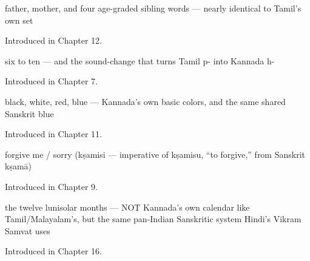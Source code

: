 \noindent\begin{minipage}[t]{\linewidth}
\raggedright
\textbf{     }\par
\small father, mother, and four age-graded sibling words — nearly identical to Tamil's own set\par
\footnotesize Introduced in Chapter 12.
\end{minipage}\par\medskip

\noindent\begin{minipage}[t]{\linewidth}
\raggedright
\textbf{    }\par
\small six to ten — and the sound-change that turns Tamil p- into Kannada h-\par
\footnotesize Introduced in Chapter 7.
\end{minipage}\par\medskip

\noindent\begin{minipage}[t]{\linewidth}
\raggedright
\textbf{   }\par
\small black, white, red, blue — Kannada's own basic colors, and the same shared Sanskrit blue\par
\footnotesize Introduced in Chapter 11.
\end{minipage}\par\medskip

\noindent\begin{minipage}[t]{\linewidth}
\raggedright
\textbf{}\par
\small forgive me / sorry (kṣamisi — imperative of kṣamisu, \textquotedblleft{}to forgive,\textquotedblright{} from Sanskrit kṣamā)\par
\footnotesize Introduced in Chapter 9.
\end{minipage}\par\medskip

\noindent\begin{minipage}[t]{\linewidth}
\raggedright
\textbf{           }\par
\small the twelve lunisolar months — NOT Kannada's own calendar like Tamil/Malayalam's, but the same pan-Indian Sanskritic system Hindi's Vikram Samvat uses\par
\footnotesize Introduced in Chapter 16.
\end{minipage}\par\medskip

